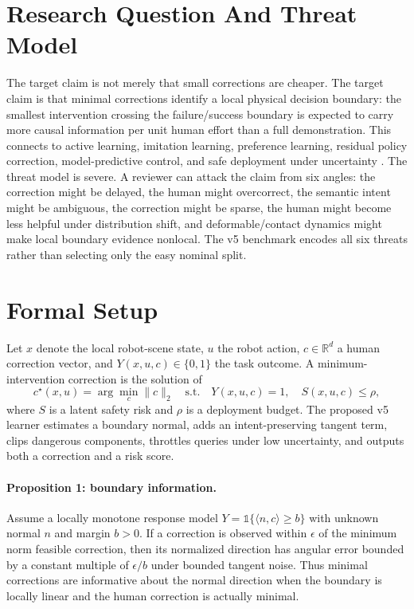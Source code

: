 \documentclass{article}
\begin{document}
\section{Research Question And Threat Model}
The target claim is not merely that small corrections are cheaper. The target claim is that minimal corrections identify a local physical decision boundary: the smallest intervention crossing the failure/success boundary is expected to carry more causal information per unit human effort than a full demonstration. This connects to active learning, imitation learning, preference learning, residual policy correction, model-predictive control, and safe deployment under uncertainty \citep{pool85_01,pool85_02,pool85_03,pool85_04,pool85_05,pool85_06}.
The threat model is severe. A reviewer can attack the claim from six angles: the correction might be delayed, the human might overcorrect, the semantic intent might be ambiguous, the correction might be sparse, the human might become less helpful under distribution shift, and deformable/contact dynamics might make local boundary evidence nonlocal. The v5 benchmark encodes all six threats rather than selecting only the easy nominal split.
\section{Formal Setup}
Let $x$ denote the local robot-scene state, $u$ the robot action, $c\in\mathbb{R}^d$ a human correction vector, and $Y(x,u,c)\in\{0,1\}$ the task outcome. A minimum-intervention correction is the solution of
\begin{equation}
c^\star(x,u)=\arg\min_c \|c\|_2 \quad \mathrm{s.t.}\quad Y(x,u,c)=1,\quad S(x,u,c)\leq \rho,
\end{equation}
where $S$ is a latent safety risk and $\rho$ is a deployment budget. The proposed v5 learner estimates a boundary normal, adds an intent-preserving tangent term, clips dangerous components, throttles queries under low uncertainty, and outputs both a correction and a risk score.
\paragraph{Proposition 1: boundary information.}
Assume a locally monotone response model $Y=\mathbb{1}\{\langle n,c\rangle\geq b\}$ with unknown normal $n$ and margin $b>0$. If a correction is observed within $\epsilon$ of the minimum norm feasible correction, then its normalized direction has angular error bounded by a constant multiple of $\epsilon/b$ under bounded tangent noise. Thus minimal corrections are informative about the normal direction when the boundary is locally linear and the human correction is actually minimal.
\end{document}
